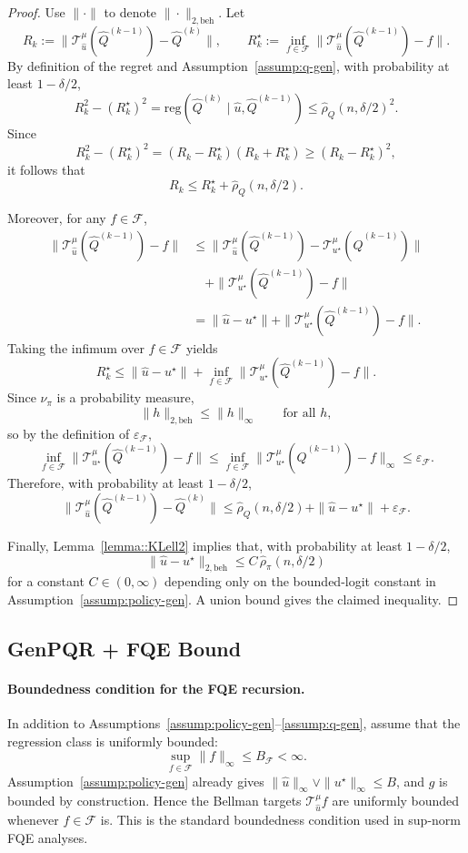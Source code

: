 \begin{proof}
Use \(\|\cdot\|\) to denote \(\|\cdot\|_{2,\mathrm{beh}}\). Let
\[
R_k
:=
\|\mathcal T_{\hat u}^\mu(\hat Q^{(k-1)})-\hat Q^{(k)}\|,
\qquad
R_k^\star
:=
\inf_{f\in\mathcal F}
\|\mathcal T_{\hat u}^\mu(\hat Q^{(k-1)})-f\|.
\]
By definition of the regret and Assumption~\ref{assump:q-gen}, with probability
at least \(1-\delta/2\),
\[
R_k^2-(R_k^\star)^2
=
\mathrm{reg}(\hat Q^{(k)}\mid \hat u,\hat Q^{(k-1)})
\le
\hat\rho_{Q}(n,\delta/2)^2.
\]
Since
\[
R_k^2-(R_k^\star)^2=(R_k-R_k^\star)(R_k+R_k^\star)\ge (R_k-R_k^\star)^2,
\]
it follows that
\[
R_k
\le
R_k^\star+\hat\rho_{Q}(n,\delta/2).
\]

Moreover, for any \(f\in\mathcal F\),
\begin{align*}
\|\mathcal T_{\hat u}^\mu(\hat Q^{(k-1)})-f\|
&\le
\|\mathcal T_{\hat u}^\mu(\hat Q^{(k-1)})
-\mathcal T_{u^\star}^\mu(\hat Q^{(k-1)})\| \\
&\quad+
\|\mathcal T_{u^\star}^\mu(\hat Q^{(k-1)})-f\| \\
&=
\|\hat u-u^\star\|
+
\|\mathcal T_{u^\star}^\mu(\hat Q^{(k-1)})-f\|.
\end{align*}
Taking the infimum over \(f\in\mathcal F\) yields
\[
R_k^\star
\le
\|\hat u-u^\star\|
+
\inf_{f\in\mathcal F}
\|\mathcal T_{u^\star}^\mu(\hat Q^{(k-1)})-f\|.
\]
Since \(\nu_\pi\) is a probability measure,
\[
\|h\|_{2,\mathrm{beh}}\le \|h\|_\infty
\qquad\text{for all }h,
\]
so by the definition of \(\varepsilon_{\mathcal F}\),
\[
\inf_{f\in\mathcal F}
\|\mathcal T_{u^\star}^\mu(\hat Q^{(k-1)})-f\|
\le
\inf_{f\in\mathcal F}
\|\mathcal T_{u^\star}^\mu(\hat Q^{(k-1)})-f\|_\infty
\le
\varepsilon_{\mathcal F}.
\]
Therefore, with probability at least \(1-\delta/2\),
\[
\|\mathcal T_{\hat u}^\mu(\hat Q^{(k-1)})-\hat Q^{(k)}\|
\le
\hat\rho_{Q}(n,\delta/2)+\|\hat u-u^\star\|+\varepsilon_{\mathcal F}.
\]

Finally, Lemma~\ref{lemma::KLell2} implies that, with probability at least
\(1-\delta/2\),
\[
\|\hat u-u^\star\|_{2,\mathrm{beh}}
\le
C\,\hat\rho_\pi(n,\delta/2)
\]
for a constant \(C \in (0,\infty)\) depending only on the bounded-logit
constant in Assumption~\ref{assump:policy-gen}. A union bound gives the
claimed inequality.
\end{proof}

\subsection{GenPQR + FQE Bound}

\paragraph{Boundedness condition for the FQE recursion.}
In addition to Assumptions~\ref{assump:policy-gen}--\ref{assump:q-gen},
assume that the regression class is uniformly bounded:
\[
\sup_{f\in\mathcal F}\|f\|_\infty \le B_{\mathcal F}<\infty.
\]
Assumption~\ref{assump:policy-gen} already gives
\(\|\hat u\|_\infty \vee \|u^\star\|_\infty \le B\), and \(g\) is bounded by
construction. Hence the Bellman targets \(\mathcal T^\mu_{\hat u}f\) are
uniformly bounded whenever \(f\in\mathcal F\) is. This is the standard
boundedness condition used in sup-norm FQE analyses.

